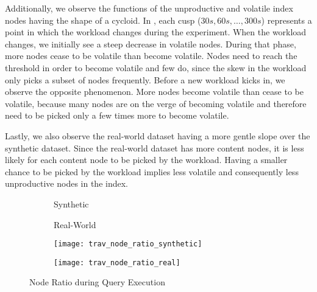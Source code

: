 \documentclass[abstracton,12pt]{scrartcl}
\theoremstyle{definition}
\begin{document}

Additionally, we observe the functions of the unproductive and volatile index
nodes having the shape of a cycloid. In , each
cusp ($30 s, 60 s, \dots, 300 s$) represents a point in which the workload
changes during the experiment. When the workload changes, we initially see a
steep decrease in volatile nodes. During that phase, more nodes cease to be
volatile than become volatile. Nodes need to reach the threshold in order to
become volatile and few do, since the skew in the workload only picks a subset of
nodes frequently. Before a new workload kicks in, we observe the opposite
phenomenon. More nodes become volatile than cease to be volatile, because many nodes are
on the verge of becoming volatile and therefore need to be picked only a few
times more to
become volatile. 

Lastly, we also observe the real-world dataset having a more gentle slope over
the synthetic dataset. Since
the real-world dataset has more content nodes, it is less likely for each
content node to be picked by the workload. Having a smaller chance to be
picked by the workload implies less volatile and consequently less
unproductive nodes in the index.  

\begin{figure}[h]
  \centering
  \begin{subfigure}{0.49\linewidth}
    \centering
    Synthetic
  \end{subfigure}
  \begin{subfigure}{0.49\linewidth}
    \centering
    Real-World
  \end{subfigure}
  \begin{subfigure}{0.49\linewidth}
    \centering
    \texttt{[image: trav\_node\_ratio\_synthetic]}
    \caption{}
    \label{fig:trav_node_ratio_synthetic}
  \end{subfigure}
  \begin{subfigure}{0.49\linewidth}
    \centering
    \texttt{[image: trav\_node\_ratio\_real]}
    \caption{}
    \label{fig:trav_node_ratio_real}
  \end{subfigure}
  \caption{Node Ratio during Query Execution}
  \label{fig:trav_node_ratio}
\end{figure}
\end{document}
